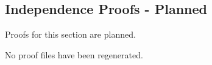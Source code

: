 \subsection*{Independence Proofs - Planned}

Proofs for this section are planned.

No proof files have been regenerated.
